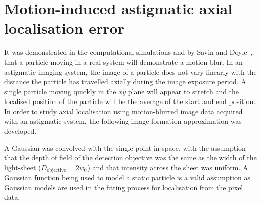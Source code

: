 \section{Motion-induced astigmatic axial localisation error}\label{sec:spt_maths}

It was demonstrated in the computational simulations and by Savin and Doyle~\cite{savinStaticDynamicErrors2005}, that a particle moving in a real system will demonstrate a motion blur.
In an astigmatic imaging system, the image of a particle does not vary linearly with the distance the particle has travelled axially during the image exposure period.
A single particle moving quickly in the \(xy \) plane will appear to stretch and the localised position of the particle will be the average of the start and end position.
In order to study axial localisation using motion-blurred image data acquired with an astigmatic system, the following image formation approximation was developed.

A Gaussian was convolved with the single point in space, with the assumption that the depth of field of the detection objective was the same as the width of the light-sheet (\(D_{\text{objective}}=2w_0\)) and that intensity across the sheet was uniform.
A Gaussian function being used to model a static particle is a valid assumption as Gaussian models are used in the fitting process for localisation from the pixel data.

